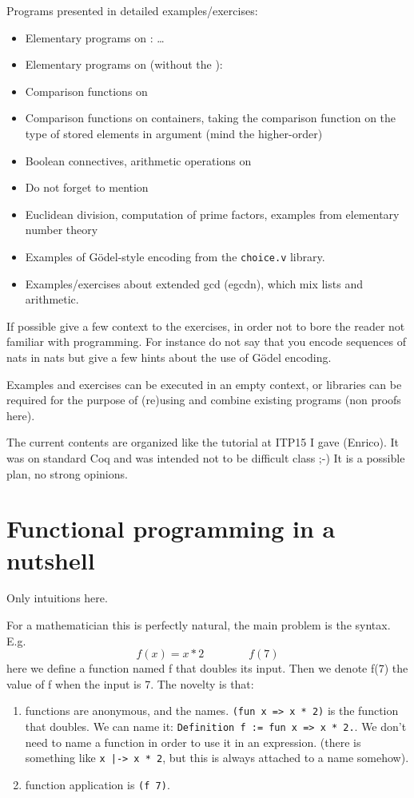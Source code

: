 Programs presented in detailed examples/exercises:
\begin{itemize}
\item Elementary programs on : \dots
\item Elementary programs on  (without the ):
\item Comparison functions on 
\item Comparison functions on containers, taking the comparison
  function on the type of stored elements in argument (mind the
  higher-order)
\item Boolean connectives, arithmetic operations on 
\item Do not forget to mention 
\item Euclidean division, computation of prime factors, examples from
  elementary number theory
\item Examples of G{\"o}del-style encoding from the {\tt choice.v} library.
\item Examples/exercises about extended gcd (egcdn), which mix lists
  and arithmetic.
\end{itemize}
If possible give a few context to the exercises, in order not to bore
the reader not familiar with programming. For instance do not say that
you encode sequences of nats in nats but give a few hints about the
use of G{\"o}del encoding.

Examples and exercises can be executed in an empty context, or
libraries can be required for the purpose of (re)using and combine existing
programs (non proofs here).

The current contents are organized like the tutorial at ITP15 I gave (Enrico).
It was on standard Coq and was intended not to be difficult class ;-)
It is a possible plan, no strong opinions.

\section{Functional programming in a nutshell}
Only intuitions here.

For a mathematician this is perfectly natural, the main problem is the syntax.  E.g.
$$f(x) = x * 2\qquad\qquad f(7)$$
here we define a function named f that doubles its input.  Then we denote f(7) the value of f
when the input is 7. The novelty is that:
\begin{enumerate}
\item functions are anonymous, and the names. \verb+(fun x => x * 2)+ is the function that
	doubles.  We can name it: \verb+Definition f := fun x => x * 2.+.  We don't need to
	name a function in order to use it in an expression. (there is something like
	\verb+x |-> x * 2+, but this is always attached to a name somehow).
\item function application is \verb+(f 7)+.
\end{enumerate}

